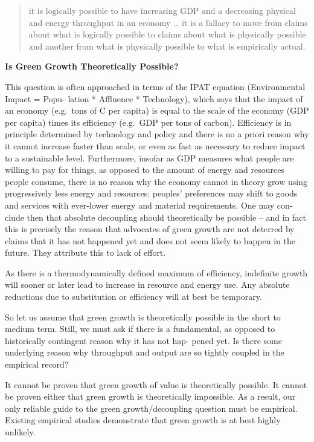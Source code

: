 \documentclass[
]{book}
\begin{document}
\begin{quote}
it is logically possible to have increasing GDP and a decreasing physical and energy throughput in an economy \ldots{}
it is a fallacy to move from claims about what is logically possible to claims about what is physically possible and
another from what is physically possible to what is empirically actual.
\end{quote}

\textbf{Is Green Growth Theoretically Possible?}

This question is often approached in terms of the IPAT equation (Environmental Impact = Popu-
lation * Affluence * Technology), which says that the impact of an economy (e.g.~tons of C per
capita) is equal to the scale of the economy (GDP per capita) times its efficiency (e.g.~GDP per tons
of carbon). Efficiency is in principle determined by technology and policy and there is no a priori
reason why it cannot increase faster than scale, or even as fast as necessary to reduce impact to a
sustainable level. Furthermore, insofar as GDP measures what people are willing to pay for things,
as opposed to the amount of energy and resources people consume, there is no reason why the
economy cannot in theory grow using progressively less energy and resources: peoples' preferences
may shift to goods and services with ever-lower energy and material requirements. One may con-
clude then that absolute decoupling should theoretically be possible -- and in fact this is precisely
the reason that advocates of green growth are not deterred by claims that it has not happened
yet and does not seem likely to happen in the future. They attribute this to lack of effort.

As there is a thermodynamically defined maximum of efficiency, indefinite growth will sooner or later
lead to increase in resource and energy use. Any absolute reductions due to substitution or efficiency
will at best be temporary.

So let us assume that green growth is theoretically possible in the short to medium term. Still, we
must ask if there is a fundamental, as opposed to historically contingent reason why it has not hap-
pened yet. Is there some underlying reason why throughput and output are so tightly coupled in the
empirical record?

It cannot be proven that green growth of value is theoretically possible.
It cannot be proven either that green growth is theoretically impossible.
As a result, our only reliable guide to the green growth/decoupling question
must be empirical.
Existing empirical studies demonstrate that green growth is at best highly unlikely.
\end{document}
